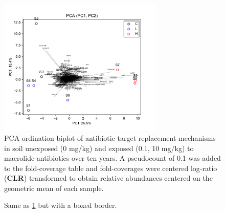 \Blindtext[10]

\begin{figure}[H]
	\centering
		\includegraphics[width=0.7\textwidth]{figures/PCA-1-2_biplot_ARG-antibiotic-target-replacement.pdf}
	\caption{PCA ordination biplot of antibiotic target replacement mechanisms in soil unexposed (0 mg/kg) and exposed (0.1, 10 mg/kg) to macrolide antibiotics over ten years. A pseudocount of 0.1 was added to the fold-coverage table and fold-coverages were centered log-ratio (\textbf{CLR}) transformed to obtain relative abundances centered on the geometric mean of each sample.}
	\label{fig:PCA-1-2_biplot_ARG-antibiotic-target-replacement}
\end{figure}

\begin{figure}[H]
	\centering
	\caption{Same as \ref{fig:PCA-1-2_biplot_ARG-antibiotic-target-replacement} but with a boxed border.}
	\label{fig:PCA-1-2_biplot_ARG-antibiotic-target-replacement_boxed}
\end{figure}
